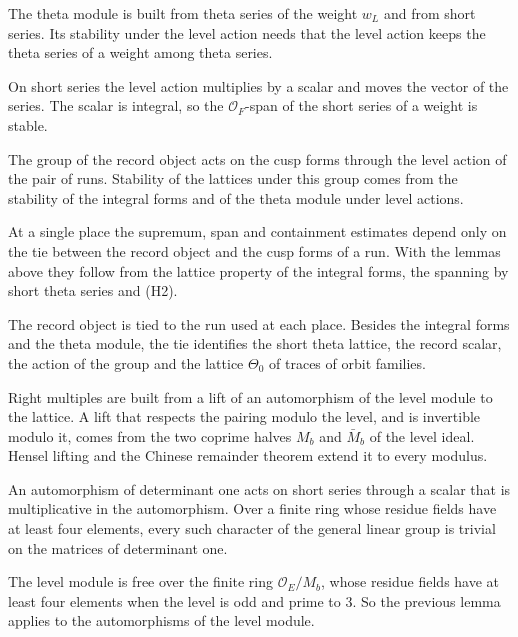 The theta module is built from theta series of the weight $w_L$ and from short series. Its stability
under the level action needs that the level action keeps the theta series of a weight among theta
series.

On short series the level action multiplies by a scalar and moves the vector of the series. The
scalar is integral, so the $\mathcal O_F$-span of the short series of a weight is stable.

The group of the record object acts on the cusp forms through the level action of the pair of runs.
Stability of the lattices under this group comes from the stability of the integral forms and of the
theta module under level actions.

At a single place the supremum, span and containment estimates depend only on the tie between the
record object and the cusp forms of a run. With the lemmas above they follow from the lattice
property of the integral forms, the spanning by short theta series and (H2).

The record object is tied to the run used at each place. Besides the integral forms and the theta
module, the tie identifies the short theta lattice, the record scalar, the action of the group and
the lattice $\Theta_0$ of traces of orbit families.

Right multiples are built from a lift of an automorphism of the level module to the lattice. A lift
that respects the pairing modulo the level, and is invertible modulo it, comes from the two coprime
halves $M_b$ and $\bar M_b$ of the level ideal. Hensel lifting and the Chinese remainder theorem extend
it to every modulus.

An automorphism of determinant one acts on short series through a scalar that is multiplicative in
the automorphism. Over a finite ring whose residue fields have at least four elements, every such
character of the general linear group is trivial on the matrices of determinant one.

The level module is free over the finite ring $\mathcal O_E/M_b$, whose residue fields have at least
four elements when the level is odd and prime to $3$. So the previous lemma applies to the
automorphisms of the level module.

